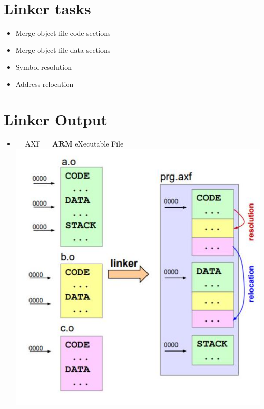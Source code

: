 \section*{Linker tasks}
\begin{itemize}
  \item Merge object file code sections
  \item Merge object file data sections
  \item Symbol resolution
  \item Address relocation
\end{itemize}

\section*{Linker Output}
\begin{itemize}
  \item $\quad$ AXF $=\mathbf{A R M}$ eXecutable File\\
\includegraphics[width=\linewidth]{images/2024_12_29_79e6b22f503fb7b4f718g-10}
\end{itemize}